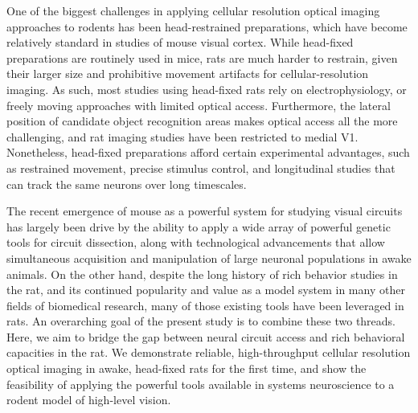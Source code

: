 One of the biggest challenges in applying cellular resolution optical imaging approaches to rodents has been head-restrained preparations, which have become relatively standard in studies of mouse visual cortex. While head-fixed preparations are routinely used in mice, rats are much harder to restrain, given their larger size and prohibitive movement artifacts for cellular-resolution imaging. As such, most studies using head-fixed rats rely on electrophysiology, or freely moving approaches with limited optical access\cite{Scott2013}. Furthermore, the lateral position of candidate object recognition areas makes optical access all the more challenging, and rat imaging studies have been restricted to medial V1\cite{Greenberg2008, Ohki2005}. Nonetheless, head-fixed preparations afford certain experimental advantages, such as restrained movement, precise stimulus control, and longitudinal studies that can track the same neurons over long timescales. 



The recent emergence of mouse as a powerful system for studying visual circuits has largely been drive by the ability to apply a wide array of powerful genetic tools for circuit dissection, along with technological advancements that allow simultaneous acquisition and manipulation of large neuronal populations in awake animals. On the other hand, despite the long history of rich behavior studies in the rat, and its continued popularity and value as a model system in many other fields of biomedical research, many of those existing tools have been leveraged in rats. An overarching goal of the present study is to combine these two threads. Here, we aim to bridge the gap between neural circuit access and rich behavioral capacities in the rat. We demonstrate reliable, high-throughput cellular resolution optical imaging in awake, head-fixed rats for the first time, and show the feasibility of applying the powerful tools available in systems neuroscience to a rodent model of high-level vision. 

